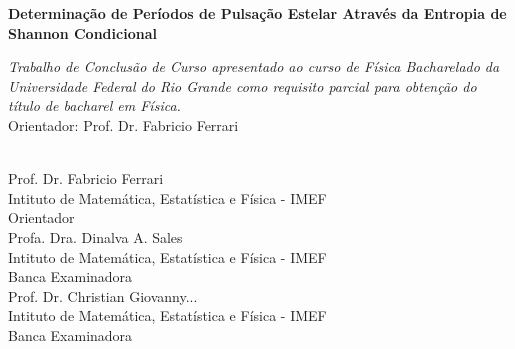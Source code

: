 \documentclass[
12pt, %
english, brazil, %
doublespacing,
nolistspacing, %
liststotoc, %
]{MastersDoctoralThesis} %
\begin{document}
\begin{titlepage}
\begin{center}
\begin{comment}
\large
Universidade Federal do Rio Grande - FURG \\
Instituto de Matemática, Estatística e Física - IMEF \\
Grupo de Astrofísica Teórica e Computacional - GATC \\
\vspace{5cm}
\end{comment}
\textbf{Determinação de Períodos de Pulsação Estelar Através da Entropia de Shannon Condicional}
\normalsize
\vfill

\begin{flushright}
 \textit{Trabalho de Conclusão de Curso apresentado ao curso de Física Bacharelado da Universidade Federal do Rio Grande como requisito parcial para obtenção do título de bacharel em Física.}\\ [0.3cm] %

\normalsize
Orientador: Prof. Dr. Fabricio Ferrari

\end{flushright}
\end{center}
\vfill
\begin{center}
\underline{\hspace{7cm}} \\
Prof. Dr. Fabricio Ferrari \\
Intituto de Matemática, Estatística e Física - IMEF \\
Orientador
\vfill
\underline{\hspace{7cm}}  \\
Profa. Dra. Dinalva A. Sales \\
Intituto de Matemática, Estatística e Física - IMEF \\
Banca Examinadora
\vfill
\underline{\hspace{7cm}}   \\
Prof. Dr. Christian Giovanny... \\
Intituto de Matemática, Estatística e Física - IMEF \\
Banca Examinadora
\vfill
\end{center}


\end{titlepage}
\end{document}
